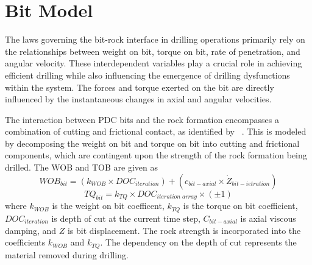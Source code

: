\section{Bit Model}

The laws governing the bit-rock interface in drilling operations primarily rely on the relationships between weight on bit, torque on bit, rate of penetration, and angular velocity. These interdependent variables play a crucial role in achieving efficient drilling while also influencing the emergence of drilling dysfunctions within the system. The forces and torque exerted on the bit are directly influenced by the instantaneous changes in axial and angular velocities.

The interaction between PDC bits and the rock formation encompasses a combination of cutting and frictional contact, as identified by ~\cite{ref:detournay1992a}.   This is modeled by decomposing the weight on bit and torque on bit into cutting and frictional components, which are contingent upon the strength of the rock formation being drilled.  The WOB and TOB are given as
\begin{equation}\label{WOB}
  WOB_{bit} = (k_{WOB}\times DOC_{iteration}) + (c_{bit-axial}\times \dot{Z}_{bit-ietration})
\end{equation}
\begin{equation}\label{Torque}
  TQ_{bit} = k_{TQ}\times DOC_{iteration\; array}\times (\pm1)
\end{equation}
where $k_{WOB}$ is the weight on bit coefficent, $k_{TQ}$ is the torque on bit coefficient, $DOC_{iteration}$ is depth of cut at the current time step, $C_{bit-axial}$ is axial viscous damping, and $Z$ is bit displacement.  The rock strength is incorporated into the coefficients $k_{WOB}$ and $k_{TQ}$.  The dependency on the depth of cut represents the material removed during drilling.

